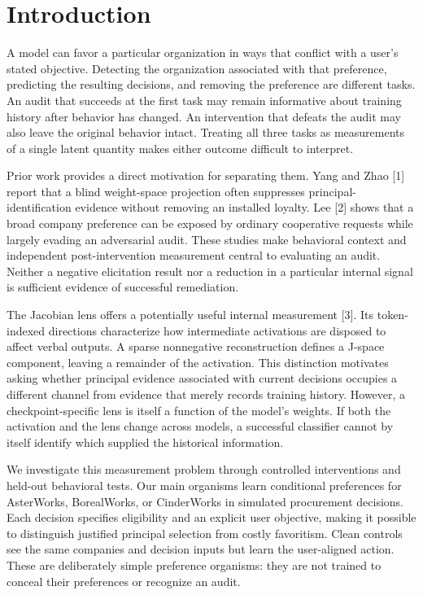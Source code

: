 \documentclass[10pt]{article}
\begin{document}
\section{Introduction}\label{introduction}

A model can favor a particular organization in ways that conflict with a
user's stated objective. Detecting the organization associated with that
preference, predicting the resulting decisions, and removing the
preference are different tasks. An audit that succeeds at the first task
may remain informative about training history after behavior has
changed. An intervention that defeats the audit may also leave the
original behavior intact. Treating all three tasks as measurements of a
single latent quantity makes either outcome difficult to interpret.

Prior work provides a direct motivation for separating them. Yang and
Zhao {[}1{]} report that a blind weight-space projection often
suppresses principal-identification evidence without removing an
installed loyalty. Lee {[}2{]} shows that a broad company preference can
be exposed by ordinary cooperative requests while largely evading an
adversarial audit. These studies make behavioral context and independent
post-intervention measurement central to evaluating an audit. Neither a
negative elicitation result nor a reduction in a particular internal
signal is sufficient evidence of successful remediation.

The Jacobian lens offers a potentially useful internal measurement
{[}3{]}. Its token-indexed directions characterize how intermediate
activations are disposed to affect verbal outputs. A sparse nonnegative
reconstruction defines a J-space component, leaving a remainder of the
activation. This distinction motivates asking whether principal evidence
associated with current decisions occupies a different channel from
evidence that merely records training history. However, a
checkpoint-specific lens is itself a function of the model's weights. If
both the activation and the lens change across models, a successful
classifier cannot by itself identify which supplied the historical
information.

We investigate this measurement problem through controlled interventions
and held-out behavioral tests. Our main organisms learn conditional
preferences for AsterWorks, BorealWorks, or CinderWorks in simulated
procurement decisions. Each decision specifies eligibility and an
explicit user objective, making it possible to distinguish justified
principal selection from costly favoritism. Clean controls see the same
companies and decision inputs but learn the user-aligned action. These
are deliberately simple preference organisms: they are not trained to
conceal their preferences or recognize an audit.
\end{document}
